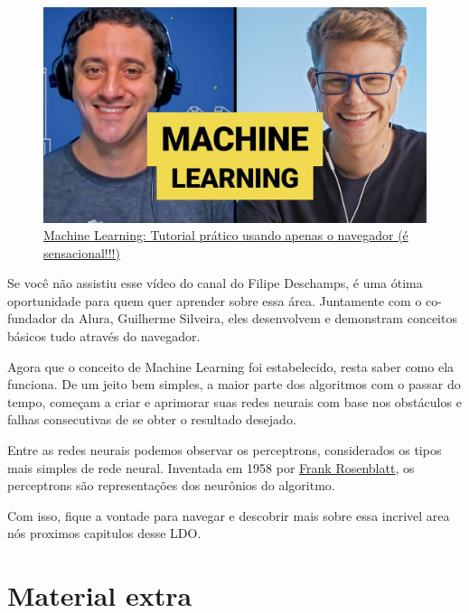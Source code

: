 \documentclass{article}
\begin{document}
    \begin{figure}[htp]
        \centering
        \includegraphics[scale=0.3]{maxresdefault.jpg}
        \caption{\href{https://youtu.be/pbVwH8o837Ahttps://www.youtube.com/watch?v=JyGGMyR3x5I}{Machine Learning: Tutorial prático usando apenas o navegador (é sensacional!!!)}}
    \end{figure}

    Se você não assistiu esse vídeo do canal do Filipe Deschamps, é uma ótima oportunidade para 
    quem quer aprender sobre essa área. Juntamente com o co-fundador da Alura, Guilherme Silveira, 
    eles desenvolvem e demonstram conceitos básicos tudo através do navegador.

    Agora que o conceito de Machine Learning foi estabelecido, resta saber como ela funciona. De 
    um jeito bem simples, a maior parte dos algoritmos com o passar do tempo, começam a criar e 
    aprimorar suas redes neurais com base nos obstáculos e falhas consecutivas de se obter o 
    resultado desejado. 
    
    Entre as redes neurais podemos observar os perceptrons, considerados os tipos mais simples de 
    rede neural. Inventada em 1958 por \href{https://en.wikipedia.org/wiki/Arthur_Samuel}{Frank Rosenblatt}, 
    os perceptrons são representações dos neurônios do algoritmo.  

    Com isso, fique a vontade para navegar e descobrir mais sobre essa incrivel area nós proximos capitulos desse
    LDO.

    \newpage
    \section*{\centering Material extra}\label{sec:extra} %
\end{document}

